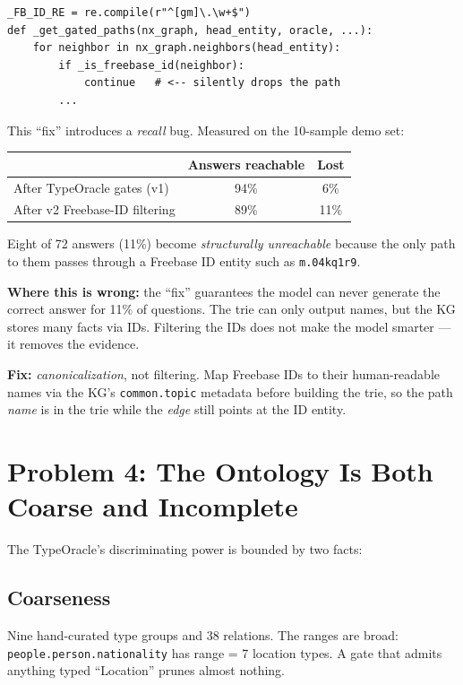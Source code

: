 \documentclass[11pt,a4paper]{article}
\begin{document}
\begin{verbatim}
_FB_ID_RE = re.compile(r"^[gm]\.\w+$")
def _get_gated_paths(nx_graph, head_entity, oracle, ...):
    for neighbor in nx_graph.neighbors(head_entity):
        if _is_freebase_id(neighbor):
            continue   # <-- silently drops the path
        ...
\end{verbatim}

This ``fix'' introduces a \emph{recall} bug.  Measured on the 10-sample
demo set:

\begin{center}
\begin{tabular}{@{}lcc@{}}
\toprule
  & Answers reachable & Lost \\
\midrule
  After TypeOracle gates (v1)        & 94\% & 6\% \\
  After v2 Freebase-ID filtering     & 89\% & 11\% \\
\bottomrule
\end{tabular}
\end{center}

Eight of 72 answers (11\%) become \emph{structurally unreachable}
because the only path to them passes through a Freebase ID entity such
as \texttt{m.04kq1r9}.

\textbf{Where this is wrong:} the ``fix'' guarantees the model can never
generate the correct answer for 11\% of questions.  The trie can only
output names, but the KG stores many facts via IDs.  Filtering the IDs
does not make the model smarter --- it removes the evidence.

\textbf{Fix:} \emph{canonicalization}, not filtering.  Map Freebase IDs
to their human-readable names via the KG's \texttt{common.topic}
metadata before building the trie, so the path \emph{name} is in the
trie while the \emph{edge} still points at the ID entity.

\section{Problem 4: The Ontology Is Both Coarse and Incomplete}

The TypeOracle's discriminating power is bounded by two facts:

\subsection{Coarseness}
Nine hand-curated type groups and 38 relations.  The ranges are broad:
\texttt{people.person.nationality} has range = 7 location types.  A gate
that admits anything typed ``Location'' prunes almost nothing.
\end{document}
